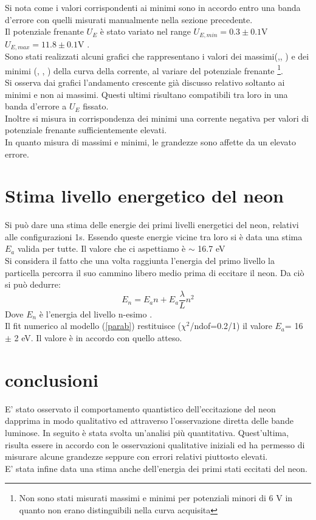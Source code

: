 Si nota come i valori corrispondenti ai minimi sono in accordo entro una banda d'errore con quelli misurati manualmente nella sezione precedente.\\
Il potenziale frenante $U_{E}$ è stato variato nel range $U_{E,min}=0.3\pm 0.1$V  $U_{E,max}=11.8 \pm 0.1$V . \\ 
Sono stati realizzati alcuni grafici che rappresentano i valori dei massimi(,, ) e dei minimi (, , ) della curva della corrente, al variare del potenziale frenante \footnote{Non sono stati misurati massimi e minimi per potenziali minori di 6 V in quanto non erano distinguibili nella curva acquisita}.\\
Si osserva dai grafici l'andamento crescente già discusso relativo soltanto ai minimi e non ai massimi. Questi ultimi risultano compatibili tra loro in una banda d'errore a $U_E$ fissato.\\
Inoltre si misura in corrispondenza dei minimi una corrente negativa per valori di potenziale frenante sufficientemente elevati. \\
In quanto misura di massimi e minimi, le grandezze sono affette da un elevato errore.
\section{Stima livello energetico del neon}
Si può dare una stima delle energie dei primi livelli energetici del neon, relativi alle configurazioni 1s. Essendo queste energie vicine tra loro si è data una stima {$E_a$} valida per tutte. Il valore che ci aspettiamo è $\sim$ 16.7 eV\\
Si considera il fatto che una volta raggiunta l'energia del primo livello la particella percorra il suo cammino libero medio prima di eccitare il neon. Da ciò si può dedurre:
\begin{equation}
E_n= E_{a}n + E_{a}\frac{\lambda}{L}n^{2}
\label{e:parab}
\end{equation}
Dove {$E_n$} è l'energia del livello n-esimo .\\
Il fit numerico al modello (\ref{parab}) restituisce ($\chi^2$/ndof=0.2/1) il valore $E_a$= 16 $\pm$ 2 eV. Il valore è in accordo con quello atteso.

\section{conclusioni}
E' stato osservato il comportamento quantistico dell'eccitazione del neon dapprima in modo qualitativo ed attraverso l'osservazione diretta delle bande luminose. In seguito è stata svolta un'analisi più quantitativa. Quest'ultima, risulta essere in accordo con le osservazioni qualitative iniziali ed ha permesso di misurare alcune grandezze seppure con errori relativi piuttosto elevati.\\
E' stata infine data una stima anche dell'energia dei primi stati eccitati del neon.